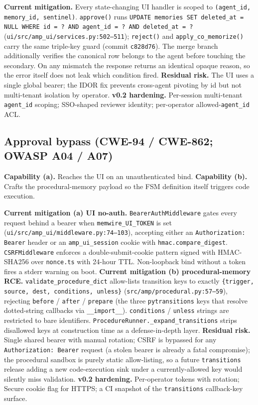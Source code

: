 \documentclass[11pt,letterpaper,twocolumn]{article}
\begin{document}
\textbf{Current mitigation.} Every state-changing UI handler is scoped to \texttt{(agent\_id, memory\_id, sentinel)}. \texttt{approve()} runs \texttt{UPDATE memories SET deleted\_at = NULL WHERE id = ? AND agent\_id = ? AND deleted\_at = ?} (\texttt{ui/src/amp\_ui/services.py:502--511}); \texttt{reject()} and \texttt{apply\_co\_memorize()} carry the same triple-key guard (commit \texttt{c828d76}). The merge branch additionally verifies the canonical row belongs to the agent before touching the secondary. On any mismatch the response returns an identical opaque reason, so the error itself does not leak which condition fired. \textbf{Residual risk.} The UI uses a single global bearer; the IDOR fix prevents cross-agent pivoting by id but not multi-tenant isolation by operator. \textbf{v0.2 hardening.} Per-session multi-tenant \texttt{agent\_id} scoping; SSO-shaped reviewer identity; per-operator allowed-\texttt{agent\_id} ACL.

\subsection{Approval bypass (CWE-94 / CWE-862; OWASP A04 / A07)}
\label{sec:threats-bypass}

\textbf{Capability (a).} Reaches the UI on an unauthenticated bind. \textbf{Capability (b).} Crafts the procedural-memory payload so the FSM definition itself triggers code execution.

\textbf{Current mitigation (a) UI no-auth.} \texttt{BearerAuthMiddleware} gates every request behind a bearer when \texttt{memwire\_UI\_TOKEN} is set (\texttt{ui/src/amp\_ui/middleware.py:74--103}), accepting either an \texttt{Authorization: Bearer} header or an \texttt{amp\_ui\_session} cookie with \texttt{hmac.compare\_digest}. \texttt{CSRFMiddleware} enforces a double-submit-cookie pattern signed with HMAC-SHA256 over \texttt{nonce.ts} with 24-hour TTL. Non-loopback bind without a token fires a stderr warning on boot. \textbf{Current mitigation (b) procedural-memory RCE.} \texttt{validate\_procedure\_dict} allow-lists transition keys to exactly \texttt{\{trigger, source, dest, conditions, unless\}} (\texttt{src/amp/procedural.py:57--59}), rejecting \texttt{before} / \texttt{after} / \texttt{prepare} (the three \texttt{pytransitions} keys that resolve dotted-string callbacks via \texttt{\_\_import\_\_}). \texttt{conditions} / \texttt{unless} strings are restricted to bare identifiers. \texttt{ProcedureRunner.\_expand\_transitions} strips disallowed keys at construction time as a defense-in-depth layer. \textbf{Residual risk.} Single shared bearer with manual rotation; CSRF is bypassed for any \texttt{Authorization: Bearer} request (a stolen bearer is already a fatal compromise); the procedural sandbox is purely static allow-listing, so a future \texttt{transitions} release adding a new code-execution sink under a currently-allowed key would silently miss validation. \textbf{v0.2 hardening.} Per-operator tokens with rotation; Secure cookie flag for HTTPS; a CI snapshot of the \texttt{transitions} callback-key surface.
\end{document}
